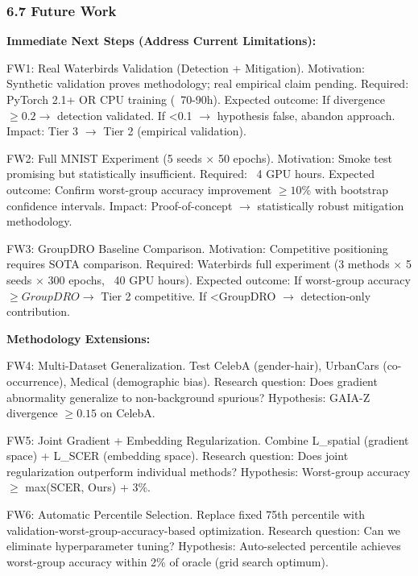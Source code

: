 \subsubsection{6.7 Future Work}

\textbf{Immediate Next Steps (Address Current Limitations):}

FW1: Real Waterbirds Validation (Detection + Mitigation). Motivation: Synthetic validation proves methodology; real empirical claim pending. Required: PyTorch 2.1+ OR CPU training (~70-90h). Expected outcome: If divergence $\geq 0.2 \rightarrow$ detection validated. If <0.1 $\rightarrow$ hypothesis false, abandon approach. Impact: Tier 3 $\rightarrow$ Tier 2 (empirical validation).

FW2: Full MNIST Experiment (5 seeds $\times$ 50 epochs). Motivation: Smoke test promising but statistically insufficient. Required: ~4 GPU hours. Expected outcome: Confirm worst-group accuracy improvement $\geq 10$\% with bootstrap confidence intervals. Impact: Proof-of-concept $\rightarrow$ statistically robust mitigation methodology.

FW3: GroupDRO Baseline Comparison. Motivation: Competitive positioning requires SOTA comparison. Required: Waterbirds full experiment (3 methods $\times$ 5 seeds $\times$ 300 epochs, ~40 GPU hours). Expected outcome: If worst-group accuracy $\geq GroupDRO \rightarrow$ Tier 2 competitive. If <GroupDRO $\rightarrow$ detection-only contribution.

\textbf{Methodology Extensions:}

FW4: Multi-Dataset Generalization. Test CelebA (gender-hair), UrbanCars (co-occurrence), Medical (demographic bias). Research question: Does gradient abnormality generalize to non-background spurious? Hypothesis: GAIA-Z divergence $\geq 0.15$ on CelebA.

FW5: Joint Gradient + Embedding Regularization. Combine L\_spatial (gradient space) + L\_SCER (embedding space). Research question: Does joint regularization outperform individual methods? Hypothesis: Worst-group accuracy $\geq$ max(SCER, Ours) + 3\%.

FW6: Automatic Percentile Selection. Replace fixed 75th percentile with validation-worst-group-accuracy-based optimization. Research question: Can we eliminate hyperparameter tuning? Hypothesis: Auto-selected percentile achieves worst-group accuracy within 2\% of oracle (grid search optimum).
